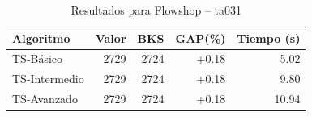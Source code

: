 \begin{table}[h]
\centering
\caption{Resultados para Flowshop -- ta031}
\label{tab:flowshop_ta031}
\begin{tabular}{lrrrr}
\hline
\textbf{Algoritmo} & \textbf{Valor} & \textbf{BKS} & \textbf{GAP(\%)} & \textbf{Tiempo (s)} \\
\hline
TS-Básico & 2729 & 2724 & +0.18 & 5.02 \\
TS-Intermedio & 2729 & 2724 & +0.18 & 9.80 \\
TS-Avanzado & 2729 & 2724 & +0.18 & 10.94 \\
\hline
\end{tabular}
\end{table}
